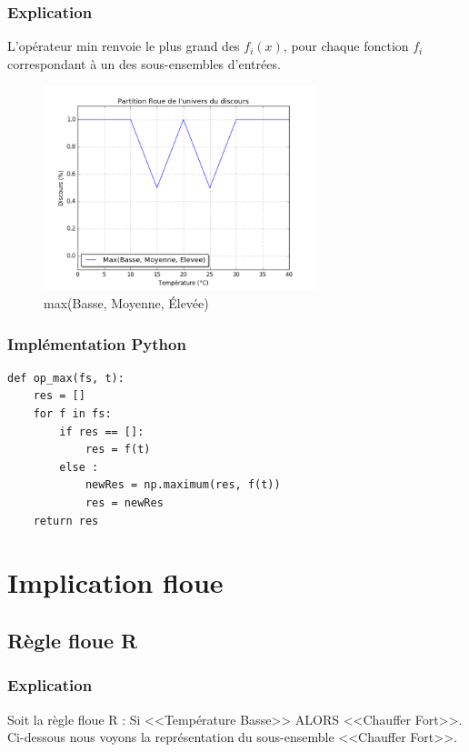\documentclass[a4paper]{article}
\begin{document}
\subsubsection{Explication}
L'opérateur min renvoie le plus grand des $f_i(x)$, pour chaque fonction $f_i$ correspondant à un des sous-ensembles d'entrées.

\begin{figure}[h]
\begin{center}
	\includegraphics[width=300px]{plot_test_max.png}
\end{center}
\caption{max(Basse, Moyenne, Élevée)}
\end{figure}

\subsubsection{Implémentation Python}
\begin{lstlisting}
def op_max(fs, t):
    res = []
    for f in fs:
        if res == []:
            res = f(t)
        else :
            newRes = np.maximum(res, f(t))
            res = newRes
    return res
\end{lstlisting}

\clearpage
\section{Implication floue}

\subsection{Règle floue R}

\subsubsection{Explication}
Soit la règle floue R : Si <<Température Basse>> ALORS <<Chauffer Fort>>.\\
Ci-dessous nous voyons la représentation du sous-ensemble <<Chauffer Fort>>.
\end{document}
